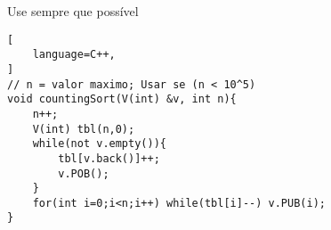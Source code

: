 \begin{center}
    Use sempre que possível
\end{center}

\begin{lstlisting}[
    language=C++, 
]
// n = valor maximo; Usar se (n < 10^5)
void countingSort(V(int) &v, int n){
    n++; 
    V(int) tbl(n,0);
    while(not v.empty()){
    	tbl[v.back()]++;
    	v.POB();
    }
	for(int i=0;i<n;i++) while(tbl[i]--) v.PUB(i);
}
\end{lstlisting}
